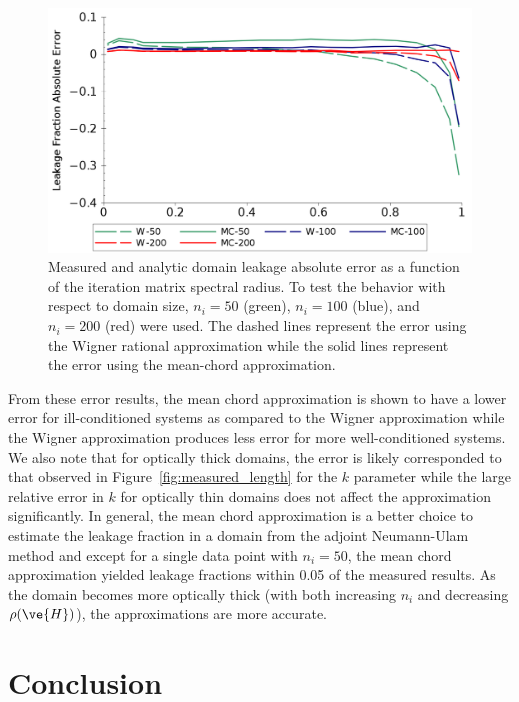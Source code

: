 \documentclass[preprint,11pt]{elsarticle}
\begin{document}
\begin{figure}[ht!]
  \begin{center}
    \includegraphics[width=\textwidth]{leakage_error.png}
  \end{center}
  \caption{Measured and analytic domain leakage absolute error as a
    function of the iteration matrix spectral radius.  To test the
    behavior with respect to domain size, $n_i=50$ (green),
    $n_i=100$ (blue), and $n_i=200$ (red) were used. The dashed
    lines represent the error using the Wigner rational
    approximation while the solid lines represent the error using
    the mean-chord approximation.}
  \label{fig:leakage_error}
\end{figure}
From these error results, the mean chord approximation is shown to have a
lower error for ill-conditioned systems as compared to the Wigner
approximation while the Wigner approximation produces less error for more
well-conditioned systems. We also note that for optically thick domains, the
error is likely corresponded to that observed in
Figure~\ref{fig:measured_length} for the $k$ parameter while the large
relative error in $k$ for optically thin domains does not affect the
approximation significantly. In general, the mean chord approximation is a
better choice to estimate the leakage fraction in a domain from the adjoint
Neumann-Ulam method and except for a single data point with $n_i=50$, the mean
chord approximation yielded leakage fractions within 0.05 of the measured
results. As the domain becomes more optically thick (with both increasing
$n_i$ and decreasing $\rho(\ve{H})$), the approximations are more accurate.

\section{Conclusion}
\end{document}
